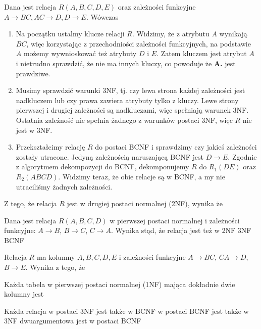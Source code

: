 \begin{exam}
Dana jest relacja $R(A, B, C, D, E)$ oraz zależności funkcyjne $A \rightarrow BC, AC \rightarrow D, D \rightarrow E$. Wówczas
\bigskip

\begin{enumerate}[\bf A.]
    \item Na początku ustalmy klucze relacji $R$. Widzimy, że z atrybutu $A$ wynikają $BC$, więc korzystając z przechodniości zależności funkcyjnych, na podstawie $A$ możemy wywnioskować też atrybuty $D$ i $E$. Zatem kluczem jest atrybut $A$ i nietrudno sprawdzić, że nie ma innych kluczy, co powoduje że \textbf{A.} jest prawdziwe.

    \item Musimy sprawdzić warunki 3NF, tj. czy lewa strona każdej zależności jest nadkluczem lub czy prawa zawiera atrybuty tylko z kluczy. Lewe strony pierwszej i drugiej zależności są nadkluczami, więc spełniają warunek 3NF. Ostatnia zależność nie spełnia żadnego z warunków postaci 3NF, więc $R$ nie jest w 3NF.

    \item Przekształcimy relację $R$ do postaci BCNF i sprawdzimy czy jakieś zależności zostały utracone. Jedyną zależnością naruszającą BCNF jest $D \to E$. Zgodnie z algorytmem dekompozycji do BCNF, dekomponujemy $R$ do $R_1(DE)$ oraz $R_2(ABCD)$. Widzimy teraz, że obie relacje są w BCNF, a my nie utraciliśmy żadnych zależności.
\end{enumerate}
\end{exam}

\begin{problems}
    \prob Z tego, że relacja $R$ jest w drugiej postaci normalnej (2NF), wynika że

    \prob Dana jest relacja $R(A, B, C, D)$ w pierwszej postaci normalnej i zależności funkcyjne: $A \rightarrow B$, $B \rightarrow C$, $C \rightarrow A$. Wynika stąd, że relacja jest też w
    \answers
    {2NF}
    {3NF}
    {BCNF}

    \prob Relacja $R$ ma kolumny $A,B,C,D,E$ i zależności funkcyjne $A\rightarrow BC$, $CA\rightarrow D$, $B\rightarrow E$. Wynika z tego, że

    \prob Każda tabela w pierwszej postaci normalnej (1NF) mająca dokładnie dwie kolumny jest

    \prob Każda relacja
    \answers
    {w postaci 3NF jest także w BCNF}
    {w postaci BCNF jest także w 3NF}
    {dwuargumentowa jest w postaci BCNF}
\end{problems}

